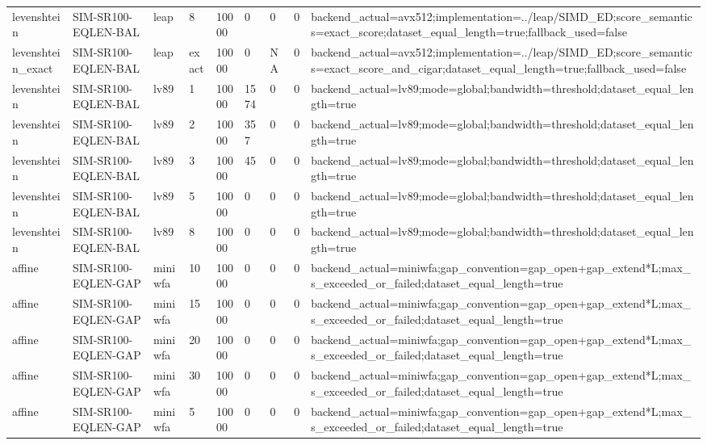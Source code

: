 \begin{tabular}{lllllllll}
levenshtein & SIM-SR100-EQLEN-BAL & leap & 8 & 10000 & 0 & 0 & 0 & backend\_actual=avx512;implementation=../leap/SIMD\_ED;score\_semantics=exact\_score;dataset\_equal\_length=true;fallback\_used=false \\
levenshtein\_exact & SIM-SR100-EQLEN-BAL & leap & exact & 10000 & 0 & NA & 0 & backend\_actual=avx512;implementation=../leap/SIMD\_ED;score\_semantics=exact\_score\_and\_cigar;dataset\_equal\_length=true;fallback\_used=false \\
levenshtein & SIM-SR100-EQLEN-BAL & lv89 & 1 & 10000 & 1574 & 0 & 0 & backend\_actual=lv89;mode=global;bandwidth=threshold;dataset\_equal\_length=true \\
levenshtein & SIM-SR100-EQLEN-BAL & lv89 & 2 & 10000 & 357 & 0 & 0 & backend\_actual=lv89;mode=global;bandwidth=threshold;dataset\_equal\_length=true \\
levenshtein & SIM-SR100-EQLEN-BAL & lv89 & 3 & 10000 & 45 & 0 & 0 & backend\_actual=lv89;mode=global;bandwidth=threshold;dataset\_equal\_length=true \\
levenshtein & SIM-SR100-EQLEN-BAL & lv89 & 5 & 10000 & 0 & 0 & 0 & backend\_actual=lv89;mode=global;bandwidth=threshold;dataset\_equal\_length=true \\
levenshtein & SIM-SR100-EQLEN-BAL & lv89 & 8 & 10000 & 0 & 0 & 0 & backend\_actual=lv89;mode=global;bandwidth=threshold;dataset\_equal\_length=true \\
affine & SIM-SR100-EQLEN-GAP & miniwfa & 10 & 10000 & 0 & 0 & 0 & backend\_actual=miniwfa;gap\_convention=gap\_open+gap\_extend*L;max\_s\_exceeded\_or\_failed;dataset\_equal\_length=true \\
affine & SIM-SR100-EQLEN-GAP & miniwfa & 15 & 10000 & 0 & 0 & 0 & backend\_actual=miniwfa;gap\_convention=gap\_open+gap\_extend*L;max\_s\_exceeded\_or\_failed;dataset\_equal\_length=true \\
affine & SIM-SR100-EQLEN-GAP & miniwfa & 20 & 10000 & 0 & 0 & 0 & backend\_actual=miniwfa;gap\_convention=gap\_open+gap\_extend*L;max\_s\_exceeded\_or\_failed;dataset\_equal\_length=true \\
affine & SIM-SR100-EQLEN-GAP & miniwfa & 30 & 10000 & 0 & 0 & 0 & backend\_actual=miniwfa;gap\_convention=gap\_open+gap\_extend*L;max\_s\_exceeded\_or\_failed;dataset\_equal\_length=true \\
affine & SIM-SR100-EQLEN-GAP & miniwfa & 5 & 10000 & 0 & 0 & 0 & backend\_actual=miniwfa;gap\_convention=gap\_open+gap\_extend*L;max\_s\_exceeded\_or\_failed;dataset\_equal\_length=true \\

\end{tabular}

